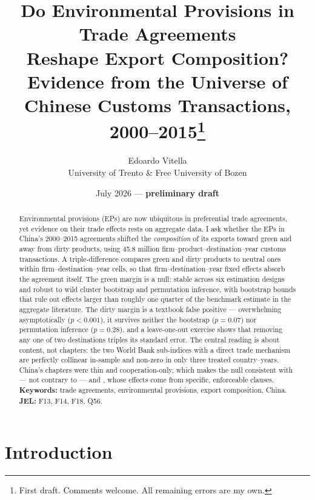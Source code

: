 \documentclass[12pt]{article}
\title{Do Environmental Provisions in Trade Agreements\\ Reshape Export Composition?\\
\large Evidence from the Universe of Chinese Customs Transactions, 2000--2015\thanks{%
First draft. Comments welcome. All remaining errors are my own.}}
\author{Edoardo Vitella\\ \small University of Trento \& Free University of Bozen}
\date{July 2026 --- \textbf{preliminary draft}}
\begin{document}
\maketitle

\begin{abstract}
\noindent Environmental provisions (EPs) are now ubiquitous in preferential trade
agreements, yet evidence on their trade effects rests on aggregate data. I ask whether the
EPs in China's 2000--2015 agreements shifted the \emph{composition} of its exports toward
green and away from dirty products, using 45.8 million
firm--product--destination--year customs transactions. A triple-difference compares green
and dirty products to neutral ones within firm--destination--year cells, so that
firm--destination--year fixed effects absorb the agreement itself. The green margin is a
null: stable across six estimation designs and robust to wild cluster bootstrap and
permutation inference, with bootstrap bounds that rule out effects larger than roughly one
quarter of the benchmark estimate in the aggregate literature. The dirty margin is a
textbook false positive --- overwhelming asymptotically ($p<0.001$), it survives neither
the bootstrap ($p=0.07$) nor permutation inference ($p=0.28$), and a leave-one-out exercise
shows that removing any one of two destinations triples its standard error. The central
reading is about content, not chapters:
the two World Bank sub-indices with a direct trade mechanism are perfectly collinear
in-sample and non-zero in only three treated country--years. China's chapters were thin and
cooperation-only, which makes the null consistent with --- not contrary to ---
\citet{brandi2020} and \citet{abman2024}, whose effects come from specific, enforceable
clauses.\\[4pt]
\textbf{Keywords:} trade agreements, environmental provisions, export composition, China.\\
\textbf{JEL:} F13, F14, F18, Q56.
\end{abstract}

\newpage

\section{Introduction}
\end{document}
